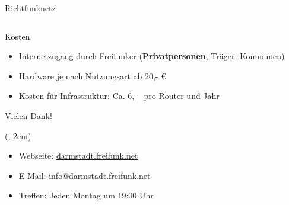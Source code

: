 \documentclass[t]{beamer}
\begin{document}
\begin{frame}{Richtfunknetz}
\begin{columns}
\begin{column}{0.25\textwidth}
\begin{center}
        \end{center}
      \end{column}
    \end{columns}
  \end{frame}

  \begin{frame}{Kosten}
    \begin{itemize}
      \item Internetzugang durch Freifunker (\textbf{Privatpersonen}, Träger, Kommunen)
      \item Hardware je nach Nutzungsart ab 20,- €
      \item Kosten für Infrastruktur: Ca. 6,- \texteuro\ pro Router und Jahr
    \end{itemize}
  \end{frame}


  \begin{frame}{Vielen Dank!}
    \begin{textblock*}{0cm}(\textwidth-2cm,-2cm)
      \begin{figure}[h]
        \def\svgwidth{2.5cm}
        
      \end{figure}
    \end{textblock*}
      \begin{itemize}
        \item Webseite: \href{http://darmstadt.freifunk.net/}{darmstadt.freifunk.net}
        \item E-Mail: \href{info@darmstadt.freifunk.net}{info@darmstadt.freifunk.net}
        \item Treffen: Jeden Montag um 19:00 Uhr
      \end{itemize}
      \vspace{1em}
  \end{frame}
\end{document}
